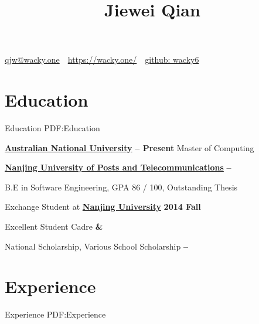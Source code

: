 \documentclass[a4paper,MMMyyyy,nonstop]{simpleresumecv}
\newcommand{\CVAuthor}{Jiewei Qian}
\newcommand{\CVWebpage}{https://wacky.one/}
\begin{document}
\thispagestyle{empty}


\title{\CVAuthor}

\begin{subtitle}
\par
\href{mailto:qjw@wacky.one}
{qjw@wacky.one}
\,\SubBulletSymbol\,
\href{\CVWebpage}
{\CVWebpage}
\,\SubBulletSymbol\,
\href{https://github.com/wacky6}
{github: wacky6}
\end{subtitle}

\begin{body}


\section
{Education}
{Education}
{PDF:Education}

\href{http://www.anu.edu.au/}
{\textbf{Australian National University}}
\hfill
\textbf{
     --
    Present
}
\SubItem
Master of Computing

\href{http://www.njupt.edu.cn/}
{\textbf{Nanjing University of Posts and Telecommunications}}
\hfill
\textbf{
     --
}

\SubItem
B.E in Software Engineering, GPA 86 / 100, Outstanding Thesis

\SubItem
Exchange Student at \href{http://www.nju.edu.cn/}{\textbf{Nanjing University}}
\hfill
\textbf{
    2014 Fall
}

\SubItem
Excellent Student Cadre
\hfill
\textbf{
     \& 
}

\SubItem
National Scholarship, Various School Scholarship
\hfill
\textbf{
     --  
}


\section
{Experience}
{Experience}
{PDF:Experience}


\end{body}
\end{document}
